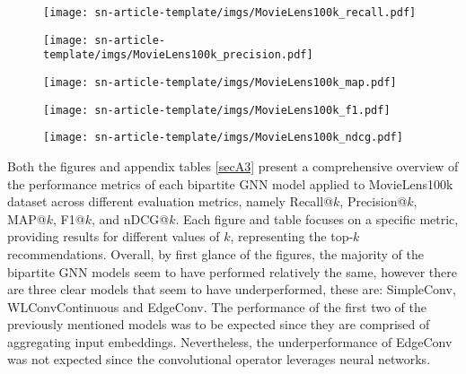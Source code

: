 \documentclass[bst/sn-nature]{sn-jnl}
\begin{document}
\begin{multicols}{2}
\begin{figure*}
\begin{center}
\begin{minipage}[b]{0.48\textwidth}
    \centering
    \texttt{[image: sn-article-template/imgs/MovieLens100k\_recall.pdf]}
    \label{fig:recall}
\end{minipage}
\hfill
\begin{minipage}[b]{0.48\textwidth}
    \centering
    \texttt{[image: sn-article-template/imgs/MovieLens100k\_precision.pdf]}
    \label{fig:precision}
\end{minipage}

\begin{minipage}[b]{0.48\textwidth}
    \centering
    \texttt{[image: sn-article-template/imgs/MovieLens100k\_map.pdf]}
    \label{fig:map}
\end{minipage}
\hfill
\begin{minipage}[b]{0.48\textwidth}
    \centering
    \texttt{[image: sn-article-template/imgs/MovieLens100k\_f1.pdf]}
    \label{fig:f1}
\end{minipage}

\begin{minipage}[b]{0.48\textwidth}
    \centering
    \texttt{[image: sn-article-template/imgs/MovieLens100k\_ndcg.pdf]}
    \label{fig:ndcg}
\end{minipage}
\end{center}
\end{figure*}

\quad Both the figures and appendix tables \ref{secA3} present a comprehensive overview of the performance metrics of each bipartite GNN model applied to MovieLens100k dataset across different evaluation metrics, namely Recall@$k$, Precision@$k$, MAP@$k$, F1@$k$, and nDCG@$k$. Each figure and table focuses on a specific metric, providing results for different values of $k$, representing the top-$k$ recommendations. Overall, by first glance of the figures, the majority of the bipartite GNN models seem to have performed relatively the same, however there are three clear models that seem to have underperformed, these are: SimpleConv, WLConvContinuous and EdgeConv. The performance of the first two of the previously mentioned models was to be expected since they are comprised of aggregating input embeddings. Nevertheless, the underperformance of EdgeConv was not expected since the convolutional operator leverages neural networks.


\end{multicols}
\end{document}

